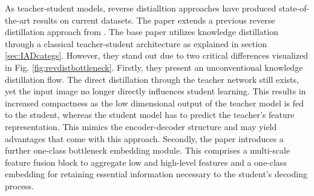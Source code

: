 As teacher-student models, reverse distialltion approaches \cite{revdist2023} \cite{Deng_2022basicrevdist} have produced state-of-the-art results on current datasets. The paper extends a previous reverse distillation approach from 
\cite{Deng_2022basicrevdist}. The base paper utilizes knowledge distillation through a classical teacher-student architecture as explained in section \ref{sec:IADcategs}. However, they stand out 
due to two critical differences visualized in Fig. \ref{fig:revdistbottleneck}. Firstly, they present an unconventional knowledge distillation flow. The direct distillation through the teacher network still exists, 
yet the input image no longer directly influences student learning. This results in increased compactness as the low dimensional output of the teacher model is fed to the student, 
whereas the student model has to predict the teacher's feature representation. This mimics the encoder-decoder structure and may yield advantages that come with this approach. Secondly, 
the paper introduces a further one-class bottleneck embedding module. This comprises a multi-scale feature fusion block to aggregate low and high-level features and a one-class embedding 
for retaining essential information necessary to the student's decoding process. 


